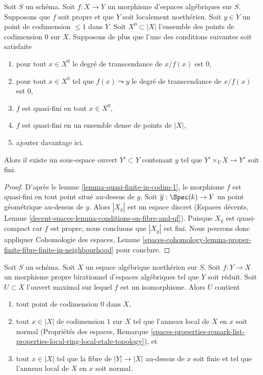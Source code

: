 \begin{lemma}
\label{lemma-finite-in-codim-1}
Soit $S$ un schéma. Soit $f : X \to Y$ un morphisme d'espaces algébriques
sur $S$. Supposons que $f$ soit propre et que $Y$ soit localement
noethérien. Soit $y \in Y$ un point de codimension $\leq 1$ dans $Y$.
Soit $X^0 \subset |X|$ l'ensemble des points de codimension $0$ sur $X$.
Supposons de plus que l'une des
conditions suivantes soit satisfaite
\begin{enumerate}
\item pour tout $x \in X^0$ le degré de transcendance de $x/f(x)$ est $0$,
\item pour tout $x \in X^0$ tel que $f(x) \leadsto y$ le degré de transcendance
de $x/f(x)$ est $0$,
\item $f$ est quasi-fini en tout $x \in X^0$,
\item $f$ est quasi-fini en un ensemble dense de points de $|X|$,
\item ajouter davantage ici.
\end{enumerate}
Alors il existe un sous-espace ouvert $Y' \subset Y$ contenant $y$ tel que
$Y' \times_Y X \to Y'$ soit fini.
\end{lemma}

\begin{proof}
D'après le lemme \ref{lemma-quasi-finite-in-codim-1}, le morphisme $f$ est
quasi-fini en tout point situé au-dessus de $y$. Soit $\overline{y} : \Spec(k) \to Y$
un point géométrique au-dessus de $y$. Alors $|X_{\overline{y}}|$ est un espace
discret (Espaces décents, Lemme
\ref{decent-spaces-lemma-conditions-on-fibre-and-qf}).
Puisque $X_{\overline{y}}$ est quasi-compact car $f$ est propre, nous concluons
que $|X_{\overline{y}}|$ est fini.
Nous pouvons donc appliquer Cohomologie des espaces, Lemme
\ref{spaces-cohomology-lemma-proper-finite-fibre-finite-in-neighbourhood}
pour conclure.
\end{proof}

\begin{lemma}
\label{lemma-modification-normal-iso-over-codimension-1}
Soit $S$ un schéma. Soit $X$ un espace algébrique noethérien sur $S$.
Soit $f : Y \to X$ un morphisme propre birationnel d'espaces algébriques
tel que $Y$ soit réduit.
Soit $U \subset X$ l'ouvert maximal sur lequel $f$ est un isomorphisme.
Alors $U$ contient
\begin{enumerate}
\item tout point de codimension $0$ dans $X$,
\item tout $x \in |X|$ de codimension $1$ sur $X$ tel que l'anneau local
de $X$ en $x$ soit normal (Propriétés des espaces, Remarque
\ref{spaces-properties-remark-list-properties-local-ring-local-etale-topology}),
et
\item tout $x \in |X|$ tel que la fibre de $|Y| \to |X|$ au-dessus de $x$ soit
finie et tel que l'anneau local de $X$ en $x$ soit normal.
\end{enumerate}
\end{lemma}

